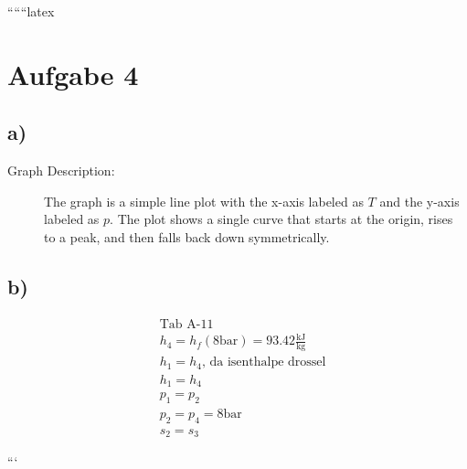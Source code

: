 
``````latex


\section*{Aufgabe 4}

\subsection*{a)}

\begin{description}
    \item[Graph Description:] The graph is a simple line plot with the x-axis labeled as $T$ and the y-axis labeled as $p$. The plot shows a single curve that starts at the origin, rises to a peak, and then falls back down symmetrically.
\end{description}

\subsection*{b)}

\begin{align*}
    &\text{Tab A-11} \\
    &h_4 = h_f (8 \text{bar}) = 93.42 \frac{\text{kJ}}{\text{kg}} \\
    &h_1 = h_4 \text{, da isenthalpe drossel} \\
    &h_1 = h_4 \\
    &p_1 = p_2 \\
    &p_2 = p_4 = 8 \text{bar} \\
    &s_2 = s_3
\end{align*}

```